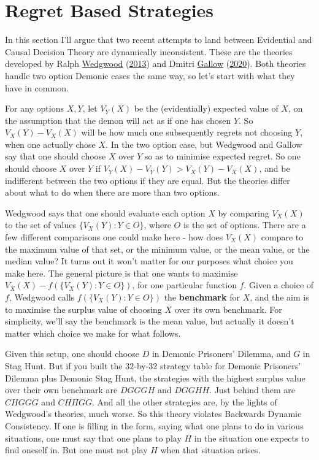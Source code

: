 \documentclass[
  12pt,
]{article}
\begin{document}
\hypertarget{regret-based-strategies}{%
\section{Regret Based Strategies}\label{regret-based-strategies}}

In this section I'll argue that two recent attempts to land between
Evidential and Causal Decision Theory are dynamically inconsistent.
These are the theories developed by Ralph
\protect\hyperlink{ref-Wedgwood2013}{Wedgwood}
(\protect\hyperlink{ref-Wedgwood2013}{2013}) and Dmitri
\protect\hyperlink{ref-Gallow2020}{Gallow}
(\protect\hyperlink{ref-Gallow2020}{2020}). Both theories handle two
option Demonic cases the same way, so let's start with what they have in
common.

For any options \(X, Y\), let \(V_Y(X)\) be the (evidentially) expected
value of \(X\), on the assumption that the demon will act as if one has
chosen \(Y\). So \(V_X(Y) - V_X(X)\) will be how much one subsequently
regrets not choosing \(Y\), when one actually chose \(X\). In the two
option case, but Wedgwood and Gallow say that one should choose \(X\)
over \(Y\) so as to minimise expected regret. So one should choose \(X\)
over \(Y\) if \(V_Y(X) - V_Y(Y) > V_X(Y) - V_X(X)\), and be indifferent
between the two options if they are equal. But the theories differ about
what to do when there are more than two options.

Wedgwood says that one should evaluate each option \(X\) by comparing
\(V_X(X)\) to the set of values \(\{V_X(Y): Y \in O\}\), where \(O\) is
the set of options. There are a few different comparisons one could make
here - how does \(V_X(X)\) compare to the maximum value of that set, or
the minimum value, or the mean value, or the median value? It turns out
it won't matter for our purposes what choice you make here. The general
picture is that one wants to maximise
\(V_X(X) - f(\{V_X(Y): Y \in O\})\), for one particular function \(f\).
Given a choice of \(f\), Wedgwood calls \(f(\{V_X(Y): Y \in O\})\) the
\textbf{benchmark} for \(X\), and the aim is to maximise the surplus
value of choosing \(X\) over its own benchmark. For simplicity, we'll
say the benchmark is the mean value, but actually it doesn't matter
which choice we make for what follows.

Given this setup, one should choose \(D\) in Demonic Prisoners' Dilemma,
and \(G\) in Stag Hunt. But if you built the 32-by-32 strategy table for
Demonic Prisoners' Dilemma plus Demonic Stag Hunt, the strategies with
the highest surplus value over their own benchmark are \(DGGGH\) and
\(DGGHH\). Just behind them are \(CHGGG\) and \(CHHGG\). And all the
other strategies are, by the lights of Wedgwood's theories, much worse.
So this theory violates Backwards Dynamic Consistency. If one is filling
in the form, saying what one plans to do in various situations, one must
say that one plans to play \(H\) in the situation one expects to find
oneself in. But one must not play \(H\) when that situation arises.
\end{document}
